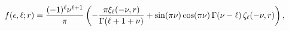 \[\mathop{f\/}\nolimits\!\left(\epsilon,\ell;r\right)=\frac{(-1)^{\ell}\nu^{\ell%
+1}}{\pi}\left(-\frac{\pi\xi_{\ell}(-\nu,r)}{\mathop{\Gamma\/}\nolimits\!\left%
(\ell+1+\nu\right)}+\mathop{\sin\/}\nolimits\!\left(\pi\nu\right)\mathop{\cos%
\/}\nolimits\!\left(\pi\nu\right)\mathop{\Gamma\/}\nolimits\!\left(\nu-\ell%
\right)\zeta_{\ell}(-\nu,r)\right),\]